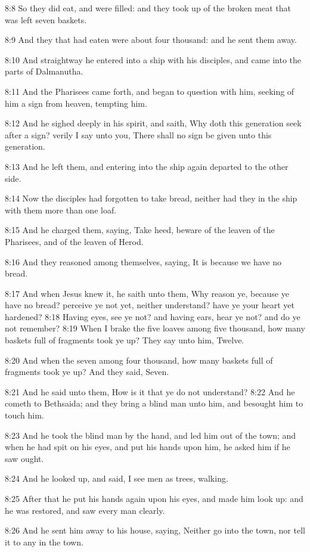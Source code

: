 8:8 So they did eat, and were filled: and they took up of the broken meat that was left seven baskets.

8:9 And they that had eaten were about four thousand: and he sent them away.

8:10 And straightway he entered into a ship with his disciples, and came into the parts of Dalmanutha.

8:11 And the Pharisees came forth, and began to question with him, seeking of him a sign from heaven, tempting him.

8:12 And he sighed deeply in his spirit, and saith, Why doth this generation seek after a sign? verily I say unto you, There shall no sign be given unto this generation.

8:13 And he left them, and entering into the ship again departed to the other side.

8:14 Now the disciples had forgotten to take bread, neither had they in the ship with them more than one loaf.

8:15 And he charged them, saying, Take heed, beware of the leaven of the Pharisees, and of the leaven of Herod.

8:16 And they reasoned among themselves, saying, It is because we have no bread.

8:17 And when Jesus knew it, he saith unto them, Why reason ye, because ye have no bread? perceive ye not yet, neither understand?  have ye your heart yet hardened?  8:18 Having eyes, see ye not? and having ears, hear ye not? and do ye not remember?  8:19 When I brake the five loaves among five thousand, how many baskets full of fragments took ye up? They say unto him, Twelve.

8:20 And when the seven among four thousand, how many baskets full of fragments took ye up? And they said, Seven.

8:21 And he said unto them, How is it that ye do not understand?  8:22 And he cometh to Bethsaida; and they bring a blind man unto him, and besought him to touch him.

8:23 And he took the blind man by the hand, and led him out of the town; and when he had spit on his eyes, and put his hands upon him, he asked him if he saw ought.

8:24 And he looked up, and said, I see men as trees, walking.

8:25 After that he put his hands again upon his eyes, and made him look up: and he was restored, and saw every man clearly.

8:26 And he sent him away to his house, saying, Neither go into the town, nor tell it to any in the town.

